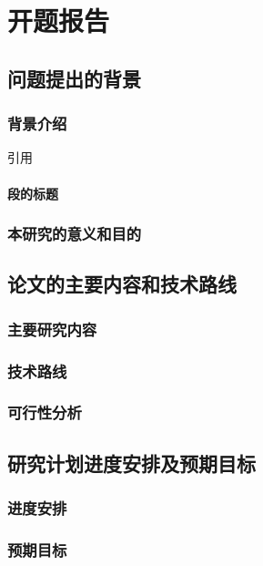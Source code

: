 \section{开题报告}

\subsection{问题提出的背景}

\subsubsection{背景介绍}
引用\cite{1}

\paragraph{段的标题}

\subsubsection{本研究的意义和目的}

\subsection{论文的主要内容和技术路线}

\subsubsection{主要研究内容}

\subsubsection{技术路线}

\subsubsection{可行性分析}

\subsection{研究计划进度安排及预期目标}

\subsubsection{进度安排}

\subsubsection{预期目标}